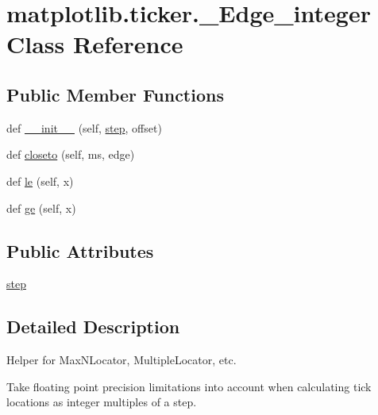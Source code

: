 \hypertarget{classmatplotlib_1_1ticker_1_1__Edge__integer}{}\section{matplotlib.\+ticker.\+\_\+\+Edge\+\_\+integer Class Reference}
\label{classmatplotlib_1_1ticker_1_1__Edge__integer}
\subsection*{Public Member Functions}
\begin{DoxyCompactItemize}
\item 
def \hyperlink{classmatplotlib_1_1ticker_1_1__Edge__integer_af9966ce968933005bf026976818f2e5a}{\+\_\+\+\_\+init\+\_\+\+\_\+} (self, \hyperlink{classmatplotlib_1_1ticker_1_1__Edge__integer_ab417601a870bd6bf8c6efc41df0d8042}{step}, offset)
\item 
def \hyperlink{classmatplotlib_1_1ticker_1_1__Edge__integer_a3d2676482268f53a75ae6773eb0c8d15}{closeto} (self, ms, edge)
\item 
def \hyperlink{classmatplotlib_1_1ticker_1_1__Edge__integer_a4f3db1889d322c22a221296d4fc20b4e}{le} (self, x)
\item 
def \hyperlink{classmatplotlib_1_1ticker_1_1__Edge__integer_aace8d8c7bc5ecf32b03501c4dbe0fcf9}{ge} (self, x)
\end{DoxyCompactItemize}
\subsection*{Public Attributes}
\begin{DoxyCompactItemize}
\item 
\hyperlink{classmatplotlib_1_1ticker_1_1__Edge__integer_ab417601a870bd6bf8c6efc41df0d8042}{step}
\end{DoxyCompactItemize}


\subsection{Detailed Description}
\begin{DoxyVerb}Helper for MaxNLocator, MultipleLocator, etc.

Take floating point precision limitations into account when calculating
tick locations as integer multiples of a step.
\end{DoxyVerb}
 

